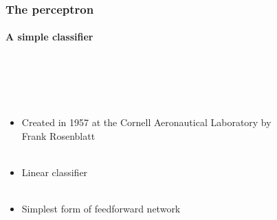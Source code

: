 \documentclass{beamer}
\begin{document}
\begin{frame}
\frametitle{The perceptron}
\framesubtitle{A simple classifier}
  \begin{columns}[T]
    \begin{column}{.5\textwidth}    \ \\ \ \\ 
    \ \\
    \begin{itemize}
    
 
     \item Created in 1957 at the Cornell Aeronautical Laboratory by Frank Rosenblatt  \\ \
\item Linear classifier \\ \

\item Simplest form of feedforward network \\ \

\end{itemize}

    \end{column}
    \begin{column}{.5\textwidth}
\begin{figure}
 

\end{figure}
\end{column}
\end{columns}
\end{frame}
\end{document}
